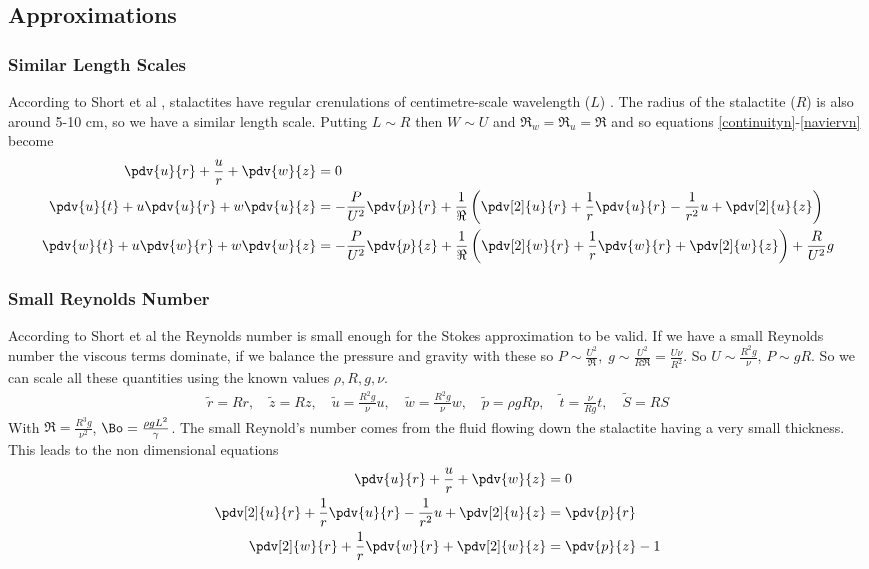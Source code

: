 \documentclass[12pt]{article}
\begin{document}
\subsection{Approximations}
\subsubsection{Similar Length Scales \label{similar}}
According to Short et al \cite{short}, stalactites have regular crenulations of centimetre-scale wavelength ($L$)%
. The radius of the stalactite ($R$) is also around 5-10 cm, so we have a similar length scale. Putting $L\sim R$ then $W\sim U$ and $\Re_w=\Re_u=\Re$ and so equations \eqref{continuityn}-\eqref{naviervn} become
\begin{align}
\pdv{ u}{ r}+\frac{ u}{ r}+\pdv{ w}{ z}&=0 \label{continuityn1}\\
\pdv{ u}{ t}+ u\pdv{ u}{ r}+ w\pdv{ u}{ z}&=-\frac{P}{U^2}\pdv{ p}{ r}+\frac{1}{\Re}\left(\pdv[2]{ u}{ r}+\frac{1}{ r}\pdv{ u}{ r}-\frac{1}{r^2} u+\pdv[2]{ u}{ z}\right)\label{navierrn1}\\
\pdv{ w}{ t}+u\pdv{ w}{ r}+ w\pdv{ w}{ z}&=-\frac{P}{U^2}\pdv{ p}{ z}+\frac{1}{\Re}\left(\pdv[2]{ w}{ r}+\frac{1}{ r}\pdv{ w}{ r}+\pdv[2]{ w}{ z}\right)+ \frac{R}{U^2}g \label{naviervn1}
\end{align}

\subsubsection{Small Reynolds Number}
According to Short et al \cite{shortshort} the Reynolds number is small enough for the Stokes approximation to be valid.
If we have a small Reynolds number the viscous terms dominate, if we balance the pressure and gravity with these so $P\sim\frac{U^2}{\Re},\; g\sim\frac{U^2}{R\Re}=\frac{U\nu}{R^2}$. So $U\sim\frac{R^2 g}{\nu}$, $P\sim gR$. So we can scale all these quantities using the known values $\rho, R, g,\nu$.
\footnotesize
\begin{align}
\tilde r=Rr, \quad \tilde z=Rz, \quad\tilde  u=\frac{R^2  g}{\nu}u, \quad \tilde w=\frac{R^2  g}{\nu}w, \quad \tilde p=\rho  g R p, \quad\tilde  t=\frac{\nu}{Rg}t,\quad \tilde S=RS
\end{align}
\normalsize
With $\Re=\frac{R^3 g}{\nu^2}$, $\Bo = \frac{\rho g L^2}{\gamma}$.  The small Reynold's number comes from the fluid flowing down the stalactite having a very small thickness. This leads to the non dimensional equations 
\begin{align}
\pdv{ u}{ r}+\frac{ u}{ r}+\pdv{ w}{ z}&=0\\\pdv[2]{ u}{ r}+\frac{1}{ r}\pdv{ u}{ r}-\frac{1}{r^2}u+\pdv[2]{ u}{ z}&=\pdv{p}{r}\\
\pdv[2]{ w}{ r}+\frac{1}{ r}\pdv{ w}{ r}+\pdv[2]{ w}{ z}&=\pdv{p}{z}-1
\end{align}
\end{document}
